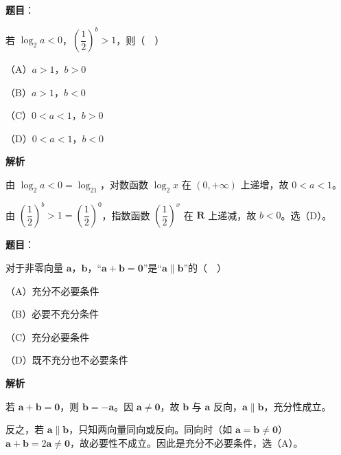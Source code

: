 \begin{answer}

\textbf{题目}：

若 $\log_2 a<0$，$\left(\dfrac12\right)^b>1$，则（　）

（A）$a>1$，$b>0$

（B）$a>1$，$b<0$

（C）$0<a<1$，$b>0$

（D）$0<a<1$，$b<0$

\textbf{解析}

由 $\log_2a<0=\log_21$，对数函数 $\log_2x$ 在 $(0,+\infty)$ 上递增，故 $0<a<1$。

由 $\left(\dfrac12\right)^b>1=\left(\dfrac12\right)^0$，指数函数 $\left(\dfrac12\right)^x$ 在 $\mathbf R$ 上递减，故 $b<0$。选（D）。


\end{answer}
\begin{answer}

\textbf{题目}：

对于非零向量 $\boldsymbol a$，$\boldsymbol b$，“$\boldsymbol a+\boldsymbol b=\boldsymbol 0$”是“$\boldsymbol a\parallel\boldsymbol b$”的（　）

（A）充分不必要条件

（B）必要不充分条件

（C）充分必要条件

（D）既不充分也不必要条件

\textbf{解析}

若 $\boldsymbol a+\boldsymbol b=\boldsymbol 0$，则 $\boldsymbol b=-\boldsymbol a$。因 $\boldsymbol a\neq\boldsymbol 0$，故 $\boldsymbol b$ 与 $\boldsymbol a$ 反向，$\boldsymbol a\parallel\boldsymbol b$，充分性成立。

反之，若 $\boldsymbol a\parallel\boldsymbol b$，只知两向量同向或反向。同向时（如 $\boldsymbol a=\boldsymbol b\neq\boldsymbol 0$）$\boldsymbol a+\boldsymbol b=2\boldsymbol a\neq\boldsymbol 0$，故必要性不成立。因此是充分不必要条件，选（A）。


\end{answer}
